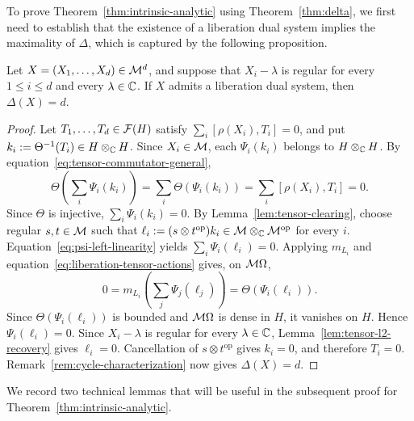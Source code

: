 To prove Theorem~\ref{thm:intrinsic-analytic} using Theorem~\ref{thm:delta}, we first need to establish that the existence of a liberation dual system implies the maximality of $\Delta$, which is captured by the following proposition.

\begin{proposition}\label{prop:liberation-delta}
Let $X=(X_1,\ldots,X_d)\in\mathcal M^d$, and suppose that $X_i-\lambda$ is regular for every $1\leq i\leq d$ and every $\lambda\in\mathbb C$.
If $X$ admits a liberation dual system, then $\Delta(X)=d$.
\end{proposition}
\begin{proof}
Let $T_1,\ldots,T_d\in\mathcal F(H)$ satisfy $\sum_i[\rho(X_i),T_i]=0$, and put $k_i:=\Theta^{-1}(T_i)\in H\otimes_{\mathbb C}H$.
Since $X_i\in\mathcal M$, each $\Psi_i(k_i)$ belongs to $H\otimes_{\mathbb C}H$.
By equation~\eqref{eq:tensor-commutator-general},
\[
 \Theta\!\left(\sum_i\Psi_i(k_i)\right)
 =\sum_i\Theta(\Psi_i(k_i))
 =\sum_i[\rho(X_i),T_i]=0.
\]
Since $\Theta$ is injective, $\sum_i\Psi_i(k_i)=0$.
By Lemma~\ref{lem:tensor-clearing}, choose regular $s,t\in\mathcal M$ such that $\ell_i:=(s\otimes t^{\mathrm{op}})k_i\in\mathcal M\otimes_{\mathbb C}\mathcal M^{\mathrm{op}}$ for every $i$.
Equation~\eqref{eq:psi-left-linearity} yields $\sum_i\Psi_i(\ell_i)=0$.
Applying $m_{L_i}$ and equation~\eqref{eq:liberation-tensor-actions} gives, on $\mathcal M\Omega$,
\[
 0=m_{L_i}\!\left(\sum_j\Psi_j(\ell_j)\right)
 =\Theta(\Psi_i(\ell_i)).
\]
Since $\Theta(\Psi_i(\ell_i))$ is bounded and $\mathcal M\Omega$ is dense in $H$, it vanishes on $H$.
Hence $\Psi_i(\ell_i)=0$.
Since $X_i-\lambda$ is regular for every $\lambda\in\mathbb C$, Lemma~\ref{lem:tensor-l2-recovery} gives $\ell_i=0$.
Cancellation of $s\otimes t^{\mathrm{op}}$ gives $k_i=0$, and therefore $T_i=0$.
Remark~\ref{rem:cycle-characterization} now gives $\Delta(X)=d$.
\end{proof}

We record two technical lemmas that will be useful in the subsequent proof for Theorem~\ref{thm:intrinsic-analytic}.

